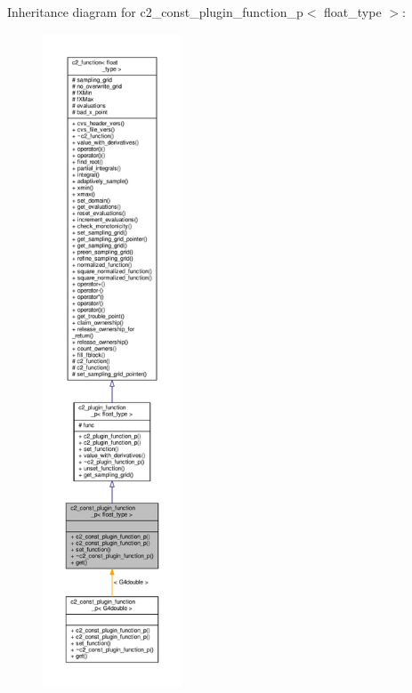 Inheritance diagram for c2\+\_\+const\+\_\+plugin\+\_\+function\+\_\+p$<$ float\+\_\+type $>$\+:
\nopagebreak
\begin{figure}[H]
\begin{center}
\leavevmode
\includegraphics[height=550pt]{classc2__const__plugin__function__p__inherit__graph}
\end{center}
\end{figure}



